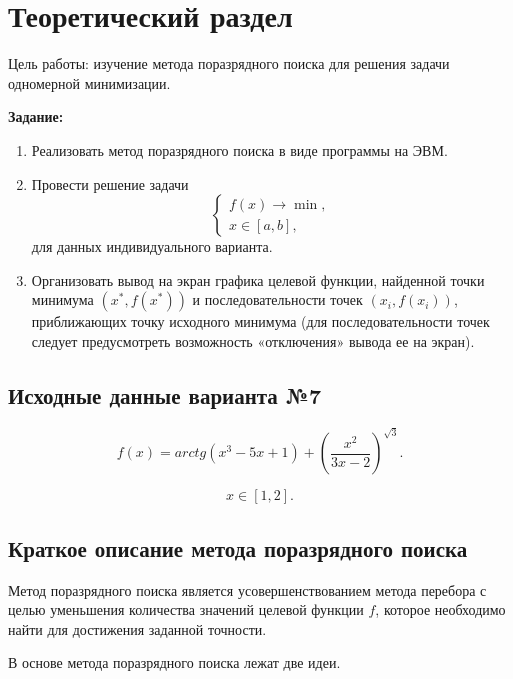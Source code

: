 \chapter{Теоретический раздел}

Цель работы: изучение метода поразрядного поиска для решения задачи одномерной минимизации.

\textbf{Задание:}
\begin{enumerate}
	\item Реализовать метод поразрядного поиска в виде программы на ЭВМ.
	\item Провести решение задачи 
	\begin{equation*}
		\begin{cases}
			f(x) \rightarrow \min, \\
			x \in [a, b],
		\end{cases}
	\end{equation*}
	для данных индивидуального варианта.
	\item Организовать вывод на экран графика целевой функции, найденной точки минимума $(x^{*}, f(x^{*}))$ и последовательности точек $(x_i, f(x_i))$, приближающих точку исходного минимума (для последовательности точек следует предусмотреть возможность «отключения» вывода ее на экран).
\end{enumerate}

\section{Исходные данные варианта №7}

\begin{equation*}
	f(x) = arctg(x^3 - 5x + 1) + \left( \frac{x^2}{3x - 2} \right)^{\sqrt{3}}.
\end{equation*}

\begin{equation*}
	x \in [1, 2].
\end{equation*}

\section{Краткое описание метода поразрядного поиска}

Метод поразрядного поиска является усовершенствованием метода перебора с целью уменьшения количества значений целевой функции $f$, которое необходимо найти для достижения заданной точности.

В основе метода поразрядного поиска лежат две идеи.

